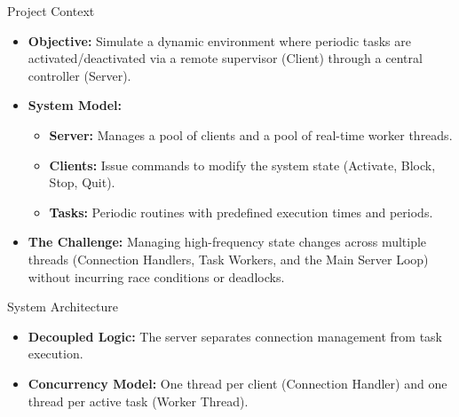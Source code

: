 \begin{frame}{Project Context}
    \begin{itemize}
        \item \textbf{Objective:} Simulate a dynamic environment where periodic tasks are activated/deactivated via a remote supervisor (Client) through a central controller (Server).
        \item \textbf{System Model:}
        \begin{itemize}
            \item \textbf{Server:} Manages a pool of clients and a pool of real-time worker threads.
            \item \textbf{Clients:} Issue commands to modify the system state (Activate, Block, Stop, Quit).
            \item \textbf{Tasks:} Periodic routines with predefined execution times and periods.
        \end{itemize}
        \item \textbf{The Challenge:} Managing high-frequency state changes across multiple threads (Connection Handlers, Task Workers, and the Main Server Loop) without incurring race conditions or deadlocks.
    \end{itemize}
\end{frame}

\begin{frame}{System Architecture}
    \begin{center}
    \end{center}
    \begin{itemize}
        \item \textbf{Decoupled Logic:} The server separates connection management from task execution.
        \item \textbf{Concurrency Model:} One thread per client (Connection Handler) and one thread per active task (Worker Thread).
    \end{itemize}
\end{frame}

